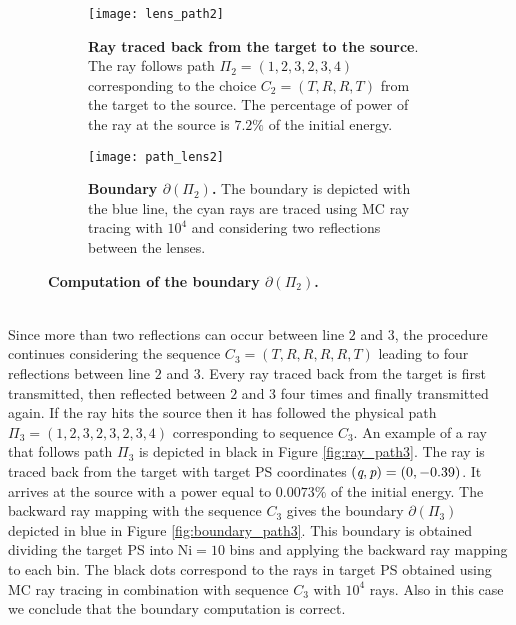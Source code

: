 \begin{figure}[t]
\centering
\begin{subfigure}[t]{.45\textwidth}
  \texttt{[image: lens\_path2]}
 \caption{\textbf{Ray traced back from the target to the source}. The ray follows path $\Pi_2 = (1,2,3,2,3,4)$ corresponding to the choice $C_2=(T,R,R,T)$ from the target to the source. The percentage of power of the ray at the source is $7.2\%$ of the initial energy.}
  \label{fig:ray_path2}
\end{subfigure}%
\hfill
\begin{subfigure}[t]{.45\textwidth}
  \texttt{[image: path\_lens2]}
  \caption{\textbf{Boundary $\partial$$(\Pi_2)$.} The boundary is depicted with the blue line, the cyan rays are traced using MC ray tracing with $10^4$ and considering two reflections between the lenses.} %
  \label{fig:boundary_path2}
\end{subfigure} %
\caption{\textbf{Computation of the boundary $\partial$$(\Pi_2)$.}}
\end{figure}
\\ \indent Since more than two reflections can occur between line $2$ and $3$, the procedure continues considering the sequence $C_3 = (T,R,R,R,R,T)$ leading to four reflections between line $2$ and $3$. Every ray traced back from the target is first transmitted, then reflected between $2$ and $3$ four times and finally transmitted again. If the ray hits the source then it has followed the physical path $\Pi_{3} = (1,2,3,2,3,2,3,4)$ corresponding to sequence $C_3$. An example of a ray that follows path $\Pi_3$ is depicted in black in Figure \ref{fig:ray_path3}. The ray is traced back from the target with target PS coordinates $(\textit{q}, \textit{p})=(0,-0.39)$. It arrives at the source with a power equal to $0.0073\%$ of the initial energy. The backward ray mapping with the sequence $C_3$ gives the boundary $\partial$$(\Pi_3)$ depicted in blue in Figure \ref{fig:boundary_path3}. This boundary is obtained dividing the target PS into $\textrm{Ni}=10$ bins and applying the backward ray mapping to each bin. The black dots correspond to the rays in target PS obtained using MC ray tracing in combination with sequence $C_3$ with $10^4$ rays. Also in this case we conclude that the boundary computation is correct.

